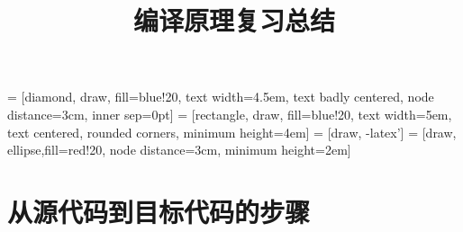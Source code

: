 \documentclass[utf8]{ctexart}
\title{编译原理复习总结}
\begin{document}
\maketitle
\tableofcontents
\thispagestyle{empty} %
\newpage

 = [diamond, draw, fill=blue!20, 
    text width=4.5em, text badly centered, node distance=3cm, inner sep=0pt]
 = [rectangle, draw, fill=blue!20, 
    text width=5em, text centered, rounded corners, minimum height=4em]
 = [draw, -latex']
 = [draw, ellipse,fill=red!20, node distance=3cm,
    minimum height=2em]

\setcounter{page}{1} %

\section{从源代码到目标代码的步骤}
\end{document}

